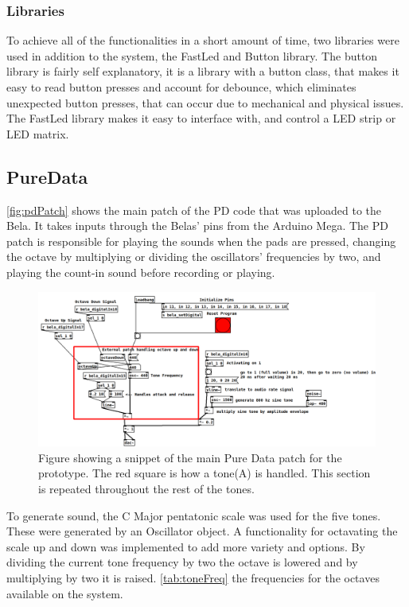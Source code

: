 		\subsubsection{Libraries}%
			To achieve all of the functionalities in a short amount of time, two libraries were used in addition to the system,
			the FastLed and Button library. The button library is fairly self explanatory, it is a library with a button class, that makes it easy to read button presses and account for debounce, which eliminates unexpected button presses, that can occur due to mechanical and physical issues. The FastLed library makes it easy to interface with, and control a LED strip or LED matrix.
	\subsection{PureData}%
		\autoref{fig:pdPatch} shows the main patch of the PD code that was uploaded to the Bela. It takes inputs through the Belas' pins from the Arduino Mega. The PD patch is responsible for playing the sounds when the pads are pressed, changing the octave by multiplying or dividing the oscillators' frequencies by two, and playing the count-in sound before recording or playing.
	
	\begin{figure}[H]
		\centering
		\includegraphics[width=1\linewidth]{figure/Implementation/pdPatch1.png}
		\caption{Figure showing a snippet of the main Pure Data patch for the prototype. The red square is how a tone(A) is handled. This section is repeated throughout the rest of the tones.}
		\label{fig:pdPatch}
	\end{figure}
	To generate sound, the C Major pentatonic scale was used for the five tones. These were generated by an Oscillator object. A functionality for octavating the scale up and down was implemented to add more variety and options. By dividing the current tone frequency by two the octave is lowered and by multiplying by two it is raised. \autoref{tab:toneFreq} the frequencies for the octaves available on the system.
	
